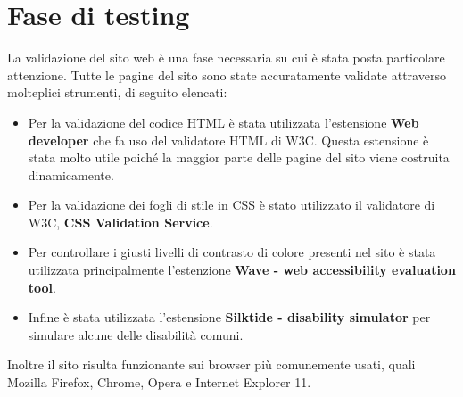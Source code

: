 \section{Fase di testing}\label{sec:fase_di_testing}
La validazione del sito web è una fase necessaria su cui è stata posta particolare attenzione. Tutte le pagine del sito sono state accuratamente validate attraverso molteplici strumenti, di seguito elencati:
\begin{itemize}
    \item Per la validazione del codice HTML è stata utilizzata l'estensione \textbf{Web developer} che fa uso del validatore HTML di W3C. Questa estensione è stata molto utile poiché la maggior parte delle pagine del sito viene costruita dinamicamente.
    \item Per la validazione dei fogli di stile in CSS è stato utilizzato il validatore di W3C, \textbf{CSS Validation Service}.
    \item Per controllare i giusti livelli di contrasto di colore presenti nel sito è stata utilizzata principalmente l'estenzione \textbf{Wave - web accessibility evaluation tool}.
    \item Infine è stata utilizzata l'estensione \textbf{Silktide - disability simulator} per simulare alcune delle disabilità comuni.
\end{itemize}
Inoltre il sito risulta funzionante sui browser più comunemente usati, quali Mozilla Firefox, Chrome, Opera e Internet Explorer 11. 
